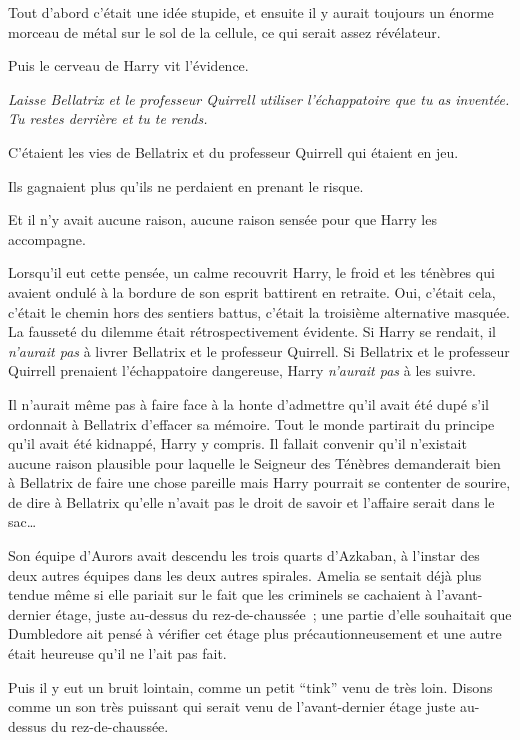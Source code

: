 Tout d'abord c'était une idée stupide, et ensuite il y aurait toujours un énorme morceau de métal sur le sol de la cellule, ce qui serait assez révélateur.

Puis le cerveau de Harry vit l'évidence.

\emph{Laisse Bellatrix et le professeur Quirrell utiliser l'échappatoire que tu as inventée. Tu restes derrière et tu te rends.}

C'étaient les vies de Bellatrix et du professeur Quirrell qui étaient en jeu.

Ils gagnaient plus qu'ils ne perdaient en prenant le risque.

Et il n'y avait aucune raison, aucune raison sensée pour que Harry les accompagne.

Lorsqu'il eut cette pensée, un calme recouvrit Harry, le froid et les ténèbres qui avaient ondulé à la bordure de son esprit battirent en retraite. Oui, c'était cela, c'était le chemin hors des sentiers battus, c'était la troisième alternative masquée. La fausseté du dilemme était rétrospectivement évidente. Si Harry se rendait, il \emph{n'aurait pas} à livrer Bellatrix et le professeur Quirrell. Si Bellatrix et le professeur Quirrell prenaient l'échappatoire dangereuse, Harry \emph{n'aurait pas} à les suivre.

Il n'aurait même pas à faire face à la honte d'admettre qu'il avait été dupé s'il ordonnait à Bellatrix d'effacer sa mémoire. Tout le monde partirait du principe qu'il avait été kidnappé, Harry y compris. Il fallait convenir qu'il n'existait aucune raison plausible pour laquelle le Seigneur des Ténèbres demanderait bien à Bellatrix de faire une chose pareille mais Harry pourrait se contenter de sourire, de dire à Bellatrix qu'elle n'avait pas le droit de savoir et l'affaire serait dans le sac…

\later

Son équipe d'Aurors avait descendu les trois quarts d'Azkaban, à l'instar des deux autres équipes dans les deux autres spirales. Amelia se sentait déjà plus tendue même si elle pariait sur le fait que les criminels se cachaient à l'avant-dernier étage, juste au-dessus du rez-de-chaussée~; une partie d'elle souhaitait que Dumbledore ait pensé à vérifier cet étage plus précautionneusement et une autre était heureuse qu'il ne l'ait pas fait.

Puis il y eut un bruit lointain, comme un petit “tink” venu de très loin. Disons comme un son très puissant qui serait venu de l'avant-dernier étage juste au-dessus du rez-de-chaussée.

